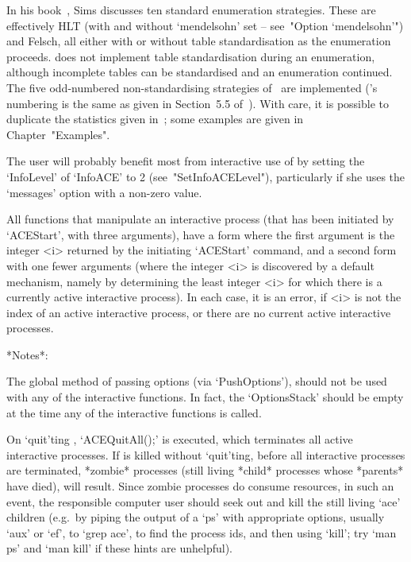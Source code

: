 In his book~\cite{Sim94},  Sims  discusses  ten  standard  enumeration
strategies. These are effectively HLT (with and  without  `mendelsohn'
set -- see~"Option `mendelsohn'")  and  Felsch,  all  either  with  or
without table standardisation as the enumeration proceeds. {\ACE} does
not implement table standardisation during  an  enumeration,  although
incomplete tables can be standardised and  an  enumeration  continued.
The five odd-numbered non-standardising strategies of~\cite{Sim94} are
implemented ({\ACE}'s numbering is the same as  given  in  Section~5.5
of~\cite{Sim94}).  With  care,  it  is  possible  to   duplicate   the
statistics  given  in~\cite{Sim94};  some  examples   are   given   in
Chapter~"Examples". %

\enditems


The user will probably benefit most from interactive use of {\ACE}  by
setting the `InfoLevel' of  `InfoACE'  to  2  (see~"SetInfoACELevel"),
particularly if she uses the `messages' option with a non-zero value.

All functions that manipulate an interactive process  (that  has  been
initiated by `ACEStart', with three arguments), have a form where  the
first  argument  is  the  integer  <i>  returned  by  the   initiating
`ACEStart' command, and a second form with one fewer arguments  (where
the integer <i> is  discovered  by  a  default  mechanism,  namely  by
determining the least integer <i>  for  which  there  is  a  currently
active interactive {\ACE} process). In each case, it is an  error,  if
<i> is not the index of an active interactive process, or there are no
current active interactive processes.

*Notes*: 

The global method of passing options (via `PushOptions'),  should  not
be  used  with  any  of  the  interactive  functions.  In  fact,   the
`OptionsStack' should be empty at the  time  any  of  the  interactive
functions is called.

On `quit'ting {\GAP}, `ACEQuitAll();' is  executed,  which  terminates
all active interactive {\ACE} processes. If {\GAP} is  killed  without
`quit'ting, before all interactive {\ACE}  processes  are  terminated,
*zombie* processes (still living  *child*  processes  whose  *parents*
have died), will result. Since zombie processes do consume  resources,
in such an event, the responsible computer user should  seek  out  and
kill the still living `ace' children (e.g.~by piping the output  of  a
`ps' with appropriate options, usually `aux' or `ef', to  `grep  ace',
to find the process ids, and then using `kill'; try `man ps' and  `man
kill' if these hints are unhelpful).

